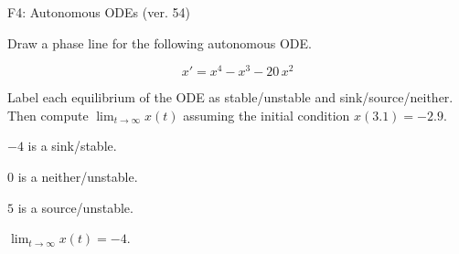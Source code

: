 \begin{exercise}
  \begin{exerciseTitle}F4: Autonomous ODEs (ver. 54)\end{exerciseTitle}
  \begin{exerciseStatement}
    

      Draw a phase line for the following 
      autonomous ODE.
    

    
\[x'= x^{4} - x^{3} - 20 \, x^{2}\]

    

      Label each equilibrium of the ODE
      as stable/unstable and sink/source/neither.
      Then compute \(\lim_{t\to\infty}x(t)\)
      assuming the initial condition
      \(x( 3.1 )= -2.9\).
    

  \end{exerciseStatement}
  \begin{exerciseAnswer}
    

      \(-4\) is a sink/stable.
      
        \(0\) is a neither/unstable.
      
      \(5\) is a source/unstable.
    

    

      \(\lim_{t\to\infty}x(t)=-4\).
    

  \end{exerciseAnswer}
\end{exercise}